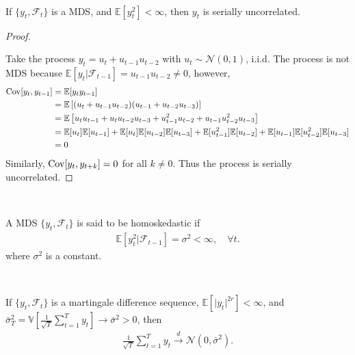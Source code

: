 \begin{theorem}\label{thm:mds-serial-uncorrelated}
    \

    If $\{y_t, \mathcal{F}_t\}$ is a MDS, and $\mathbb{E}[y_t^2] < \infty$, then
    $y_t$ is serially uncorrelated.
\end{theorem}
\begin{proof}
    \

    Take the process $y_t = u_t + u_{t-1} u_{t-2}$ with $u_t \sim \mathcal{N}(0,1)$, i.i.d.
    The process is not MDS because $\mathbb{E}[y_t | \mathcal{F}_{t-1}] = u_{t-1} u_{t-2} \neq 0$,
    however,
    \begin{align*}
        \operatorname{Cov}[y_t, y_{t-1}] &= \mathbb{E}[y_t y_{t-1}] \\
        &= \mathbb{E}\left[ (u_t + u_{t-1} u_{t-2}) (u_{t-1} + u_{t-2} u_{t-3}) \right] \\
        &= \mathbb{E}\left[ u_t u_{t-1} + u_t u_{t-2} u_{t-3} + u_{t-1}^2 u_{t-2} + u_{t-1} u_{t-2}^2 u_{t-3} \right] \\
        &= \mathbb{E}[u_t] \mathbb{E}[u_{t-1}] + \mathbb{E}[u_t] \mathbb{E}[u_{t-2}] \mathbb{E}[u_{t-3}] + \mathbb{E}[u_{t-1}^2] \mathbb{E}[u_{t-2}] + \mathbb{E}[u_{t-1}] \mathbb{E}[u_{t-2}^2] \mathbb{E}[u_{t-3}] \\
        &= 0
    \end{align*}
    Similarly, $\operatorname{Cov}[y_t, y_{t+k}] = 0$ for all $k \neq 0$. Thus the process is serially uncorrelated.
\end{proof}

\begin{definition}\label{homoskedastic-mds}
    \

    A MDS $\{y_t, \mathcal{F}_t\}$ is said to be homoskedastic if
    \begin{gather*}
        \mathbb{E}[y_t^2 | \mathcal{F}_{t-1}] = \sigma^2 < \infty, \quad \forall t.
    \end{gather*}
    where $\sigma^2$ is a constant.
\end{definition}

\begin{theorem}\label{thm:mds-clt}
    \

    If $\{y_t, \mathcal{F}_t\}$ is a martingale difference sequence, $\mathbb{E}[\vert y_t \vert ^{2r}] < \infty$,
    and $\bar{\sigma}_T^2 =  \mathbb{V}\left[\frac{1}{\sqrt{T}} \sum_{t=1}^{T} y_t \right] \to \bar{\sigma}^2 > 0$, then
    \begin{gather*}
        \frac{1}{\sqrt{T}} \sum_{t=1}^{T} y_t \xrightarrow{d} \mathcal{N}(0, \bar{\sigma}^2).
    \end{gather*}
\end{theorem}